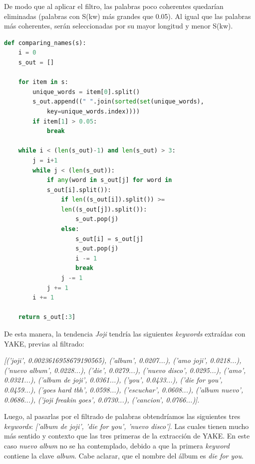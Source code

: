 \vspace{0.3cm}

De modo que al aplicar el filtro, las palabras poco coherentes quedarían eliminadas (palabras con S(kw) más grandes que 0.05). Al igual que las palabras más coherentes, serán seleccionadas por su mayor longitud y menor S(kw).

\vspace{0.3cm}

\begin{lstlisting}[caption=Filtrado de las \textit{keywords},          label={lst:listing-python},language=Python]
def comparing_names(s):
    i = 0
    s_out = []

    for item in s:
        unique_words = item[0].split()
        s_out.append((" ".join(sorted(set(unique_words),
            key=unique_words.index))))
        if item[1] > 0.05:
            break

    while i < (len(s_out)-1) and len(s_out) > 3:
        j = i+1
        while j < (len(s_out)):
            if any(word in s_out[j] for word in 
            s_out[i].split()):
                if len((s_out[i]).split()) >= 
                len((s_out[j]).split()):
                    s_out.pop(j)
                else:
                    s_out[i] = s_out[j]
                    s_out.pop(j)
                    i -= 1
                    break
                j -= 1
            j += 1
        i += 1

    return s_out[:3]
\end{lstlisting}

De esta manera, la tendencia \textit{Joji} tendría las siguientes \textit{keywords} extraídas con \ac{YAKE}, previas al filtrado:

\vspace{0.3cm}

\textit{[('joji', 0.0023616958679190565), ('album', 0.0207...), ('amo joji', 0.0218...), ('nuevo album', 0.0228...), ('die', 0.0279...), ('nuevo disco', 0.0295...), ('amo', 0.0321...), ('album de joji', 0.0361...), ('you', 0.0433...), ('die for you', 0.0459...), ('goes hard tbh', 0.0598...), ('escuchar', 0.0608...), ('album nuevo', 0.0686...), ('joji freakin goes', 0.0730...), ('cancion', 0.0766...)]}.

\vspace{0.3cm}

Luego, al pasarlas por el filtrado de palabras obtendríamos las siguientes tres \textit{keywords}: \textit{['album de joji', 'die for you', 'nuevo disco']}. Las cuales tienen mucho más sentido y contexto que las tres primeras de la extracción de \ac{YAKE}. En este caso \textit{nuevo album} no se ha contemplado, debido a que la primera \textit{keyword} contiene la clave \textit{album}. Cabe aclarar, que el nombre del álbum es \textit{die for you}.

